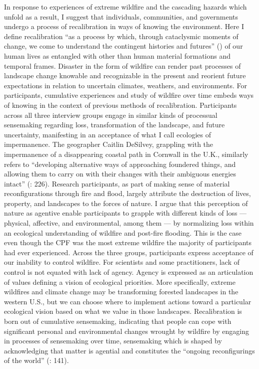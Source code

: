 \documentclass[
]{article}
\begin{document}
In response to experiences of extreme wildfire and the cascading hazards which unfold as a result, I suggest that individuals, communities, and governments undergo a process of recalibration in ways of knowing the environment. Here I define recalibration ``as a process by which, through cataclysmic moments of change, we come to understand the contingent histories and futures'' () of our human lives as entangled with other than human material formations and temporal frames. Disaster in the form of wildfire can render past processes of landscape change knowable and recognizable in the present and reorient future expectations in relation to uncertain climates, weathers, and environments. For participants, cumulative experiences and study of wildfire over time embeds ways of knowing in the context of previous methods of recalibration. Participants across all three interview groups engage in similar kinds of processual sensemaking regarding loss, transformation of the landscape, and future uncertainty, manifesting in an acceptance of what I call ecologies of impermanence. The geographer Caitlin DeSilvey, grappling with the impermanence of a disappearing coastal path in Cornwall in the U.K., similarly refers to ``developing alternative ways of approaching foundered things, and allowing them to carry on with their changes with their ambiguous energies intact'' (: 226). Research participants, as part of making sense of material reconfigurations through fire and flood, largely attribute the destruction of lives, property, and landscapes to the forces of nature. I argue that this perception of nature as agentive enable participants to grapple with different kinds of loss --- physical, affective, and environmental, among them --- by normalizing loss within an ecological understanding of wildfire and post-fire flooding. This is the case even though the CPF was the most extreme wildfire the majority of participants had ever experienced. Across the three groups, participants express acceptance of our inability to control wildfire. For scientists and some practitioners, lack of control is not equated with lack of agency. Agency is expressed as an articulation of values defining a vision of ecological priorities. More specifically, extreme wildfires and climate change may be transforming forested landscapes in the western U.S., but we can choose where to implement actions toward a particular ecological vision based on what we value in those landscapes. Recalibration is born out of cumulative sensemaking, indicating that people can cope with significant personal and environmental changes wrought by wildfire by engaging in processes of sensemaking over time, sensemaking which is shaped by acknowledging that matter is agential and constitutes the ``ongoing reconfigurings of the world'' (: 141).
\end{document}
